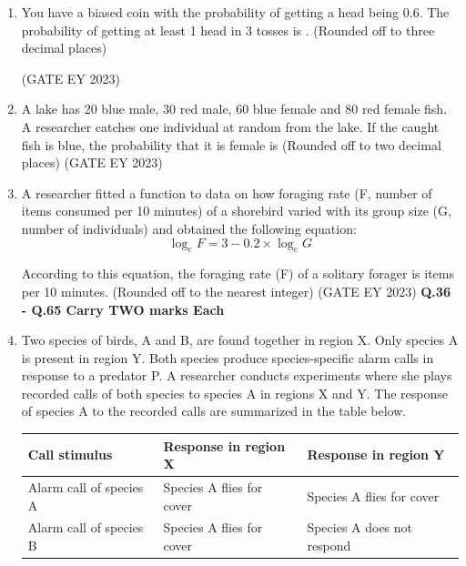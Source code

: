 \documentclass[journal,12pt,onecolumn]{IEEEtran}
\theoremstyle{remark}
\begin{document}
\begin{enumerate}


 \item You have a biased coin with the probability of getting a head being 0.6. The
probability of getting at least 1 head in 3 tosses is \underline{\hspace{1.5cm}}.
(Rounded off to three decimal places)

\hfill{(GATE EY 2023)}


 \item A lake has 20 blue male, 30 red male, 60 blue female and 80 red female fish. A
researcher catches one individual at random from the lake. If the caught fish is
blue, the probability that it is female is \underline{\hspace{1.5cm}}
(Rounded off to two decimal places)
\hfill{(GATE EY 2023)}



 \item A researcher fitted a function to data on how foraging rate (F, number of items
consumed per 10 minutes) of a shorebird varied with its group size (G, number of
individuals) and obtained the following equation:
\[
\log_{e} F = 3 - 0.2 \times \log_{e} G
\]

According to this equation, the foraging rate (F) of a solitary forager is
\underline{\hspace{1.5cm}} items per 10 minutes.
(Rounded off to the nearest integer)
\hfill{(GATE EY 2023)}
\textbf{Q.36 - Q.65 Carry TWO marks Each}

 \item 
 Two species of birds, A and B, are found together in region X. Only species A is
present in region Y. Both species produce species-specific alarm calls in response
to a predator P. A researcher conducts experiments where she plays recorded calls
of both species to species A in regions X and Y. The response of species A to the
recorded calls are summarized in the table below.

\begin{table}[h!]
\centering
\begin{tabular}{|l|l|l|}
\hline
\textbf{Call stimulus} & \textbf{Response in region X} & \textbf{Response in region Y} \\ \hline
Alarm call of species A & Species A flies for cover & Species A flies for cover \\ \hline
Alarm call of species B & Species A flies for cover & Species A does not respond \\ \hline
\end{tabular}
\end{table}



\end{enumerate}
\end{document}
